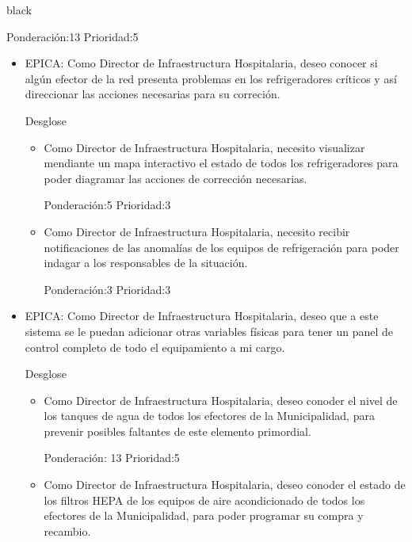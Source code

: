 \documentclass[11pt]{charter}
\begin{document}
\begin{consigna}{black}
\begin{itemize}
\begin{itemize}
Ponderación:13 Prioridad:5
	\end{itemize}
\end{itemize}

\begin{itemize}
\item EPICA: Como Director de Infraestructura Hospitalaria, deseo conocer si algún efector de la red presenta problemas en los refrigeradores críticos y así direccionar las acciones necesarias para su correción. 

Desglose

	\begin{itemize}
	\item Como Director de Infraestructura Hospitalaria, necesito visualizar mendiante un mapa interactivo el estado de todos los refrigeradores para poder diagramar las acciones de corrección necesarias.  

Ponderación:5 Prioridad:3
	\end{itemize}

	\begin{itemize}
	\item Como Director de Infraestructura Hospitalaria, necesito recibir notificaciones de las anomalías de los equipos de refrigeración para poder indagar a los responsables de la situación.  

Ponderación:3 Prioridad:3
	\end{itemize}

\end{itemize}


\begin{itemize}
\item EPICA: Como Director de Infraestructura Hospitalaria, deseo que a este sistema se le puedan adicionar otras variables físicas para tener un panel de control completo de todo el equipamiento a mi cargo. 

Desglose

	\begin{itemize}
	\item Como Director de Infraestructura Hospitalaria, deseo conoder el nivel de los tanques de agua de todos los efectores de la Municipalidad, para prevenir posibles faltantes de este elemento primordial.
	
Ponderación: 13 Prioridad:5
	\end{itemize}

	\begin{itemize}
	\item Como Director de Infraestructura Hospitalaria, deseo conoder el estado de los filtros HEPA de los equipos de aire acondicionado de todos los efectores de la Municipalidad, para poder programar su compra y recambio.
	

\end{itemize}
\end{itemize}
\end{consigna}
\end{document}

